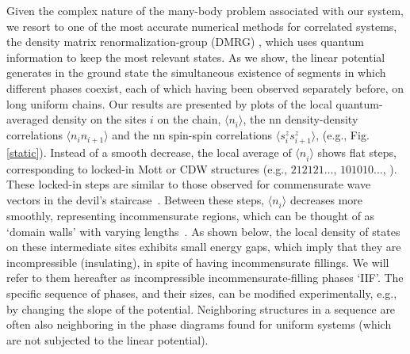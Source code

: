 \documentclass[aps,prl,showpacs,twocolumn,superscriptaddress]{revtex4-2}
\begin{document}
Given the
complex nature of the many-body problem associated with our system, we resort to one of the most accurate numerical methods for correlated systems, the density matrix renormalization-group (DMRG) \cite{white,whiteprb,reviewkaren,Uli,Uli2,banuls}, which uses quantum information to keep the most relevant states.
As we show, the linear potential generates in the ground state the simultaneous existence of segments in which different phases coexist, each of which having been observed separately before, on long uniform chains. Our results are presented by plots of the local quantum-averaged density  on the sites $i$ on the chain,  $\langle n^{}_i\rangle$,
the nn density-density correlations $\langle n_in_{i+1}\rangle$ and the nn spin-spin correlations $\langle s^z_is^z_{i+1}\rangle$,
(e.g., Fig. \ref{static}). Instead of a smooth decrease, the local average of $\langle n^{}_i\rangle$ shows flat steps, corresponding to locked-in Mott or CDW structures (e.g., $212121\dots$, $101010\dots$, \cite{Com}). These locked-in steps are similar to those observed for commensurate wave vectors in the devil's staircase~\cite{bak,lockin}.   Between these steps,
 $\langle n^{}_i\rangle$ decreases more smoothly, representing incommensurate regions, which can be thought of as `domain walls' with varying lengths~\cite{Cho}. As shown below, the local density of states on these intermediate sites exhibits small energy gaps, which imply that they are incompressible  (insulating),  in spite of having incommensurate fillings. We will refer to them hereafter as incompressible incommensurate-filling phases `IIF'.
The specific sequence of phases, and their sizes, can be modified experimentally, e.g.,  by changing the slope of the potential.
Neighboring structures in a sequence are often also neighboring in the phase diagrams
found for uniform systems (which are not subjected to the linear potential).



\vspace{0.2cm}




\end{document}
